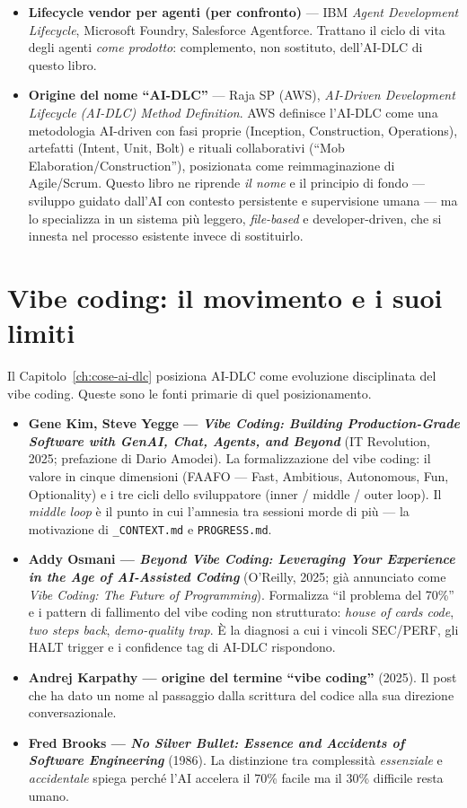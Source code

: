 \begin{itemize}
  \item \textbf{Lifecycle vendor per agenti (per confronto)} --- IBM \textit{Agent Development Lifecycle}, Microsoft Foundry, Salesforce Agentforce. Trattano il ciclo di vita degli agenti \textit{come prodotto}: complemento, non sostituto, dell'AI-DLC di questo libro.
  \item \textbf{Origine del nome ``AI-DLC''} --- Raja SP (AWS), \textit{AI-Driven Development Lifecycle (AI-DLC) Method Definition}. AWS definisce l'AI-DLC come una metodologia AI-driven con fasi proprie (Inception, Construction, Operations), artefatti (Intent, Unit, Bolt) e rituali collaborativi (``Mob Elaboration/Construction''), posizionata come reimmaginazione di Agile/Scrum. Questo libro ne riprende \textit{il nome} e il principio di fondo --- sviluppo guidato dall'AI con contesto persistente e supervisione umana --- ma lo specializza in un sistema più leggero, \textit{file-based} e developer-driven, che si innesta nel processo esistente invece di sostituirlo.
\end{itemize}

\section*{Vibe coding: il movimento e i suoi limiti}

Il Capitolo~\ref{ch:cose-ai-dlc} posiziona AI-DLC come evoluzione disciplinata del vibe coding. Queste sono le fonti primarie di quel posizionamento.

\begin{itemize}
  \item \textbf{Gene Kim, Steve Yegge --- \textit{Vibe Coding: Building Production-Grade Software with GenAI, Chat, Agents, and Beyond}} (IT Revolution, 2025; prefazione di Dario Amodei). La formalizzazione del vibe coding: il valore in cinque dimensioni (FAAFO --- Fast, Ambitious, Autonomous, Fun, Optionality) e i tre cicli dello sviluppatore (inner / middle / outer loop). Il \textit{middle loop} è il punto in cui l'amnesia tra sessioni morde di più --- la motivazione di \texttt{\_CONTEXT.md} e \texttt{PROGRESS.md}.
  \item \textbf{Addy Osmani --- \textit{Beyond Vibe Coding: Leveraging Your Experience in the Age of AI-Assisted Coding}} (O'Reilly, 2025; già annunciato come \textit{Vibe Coding: The Future of Programming}). Formalizza ``il problema del 70\%'' e i pattern di fallimento del vibe coding non strutturato: \textit{house of cards code}, \textit{two steps back}, \textit{demo-quality trap}. È la diagnosi a cui i vincoli SEC/PERF, gli HALT trigger e i confidence tag di AI-DLC rispondono.
  \item \textbf{Andrej Karpathy --- origine del termine ``vibe coding''} (2025). Il post che ha dato un nome al passaggio dalla scrittura del codice alla sua direzione conversazionale.
  \item \textbf{Fred Brooks --- \textit{No Silver Bullet: Essence and Accidents of Software Engineering}} (1986). La distinzione tra complessità \textit{essenziale} e \textit{accidentale} spiega perché l'AI accelera il 70\% facile ma il 30\% difficile resta umano.
\end{itemize}

